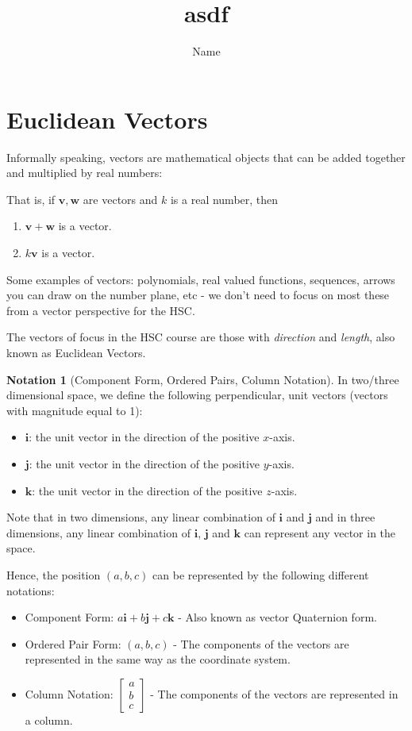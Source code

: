 \documentclass[11pt, a4paper, oneside]{exam}
\title{asdf}
\author{Name
}
\date{}
\theoremstyle{definition}\newtheorem{define}{Definition}[section]
\theoremstyle{remark}\newtheorem{remark}{Remark}
\theoremstyle{definition}\newtheorem{example}{Example}[subsection]
\theoremstyle{definition}\newtheorem{notation}{Notation}[section]
\theoremstyle{definition}\newtheorem{theorem}{Theorem}[section]
\theoremstyle{definition}\newtheorem{corollary}{Corollary}[section]
\begin{document}
%
%

\section{Euclidean Vectors}

Informally speaking, vectors are mathematical objects that can be added together and multiplied by real numbers:

That is, if $\mathbf{v}, \mathbf{w}$ are vectors and $k$ is a real number, then
\begin{enumerate}
  \item $\mathbf{v} + \mathbf{w}$ is a vector.
  \item $k\mathbf{v}$ is a vector.
\end{enumerate}

Some examples of vectors: polynomials, real valued functions, sequences, arrows you can draw on the number plane, etc - we don't need to focus on most these from a vector perspective for the HSC.

The vectors of focus in the HSC course are those with \emph{direction} and \emph{length}, also known as Euclidean Vectors.

\begin{notation}[Component Form, Ordered Pairs, Column Notation]
	In two/three dimensional space, we define the following perpendicular, unit vectors (vectors with magnitude equal to 1):
	\begin{itemize}
		\item $\mathbf{i}$: the unit vector in the direction of the positive $x$-axis.
		\item $\mathbf{j}$: the unit vector in the direction of the positive $y$-axis.
		\item $\mathbf{k}$: the unit vector in the direction of the positive $z$-axis.
	\end{itemize}
	Note that in two dimensions, any linear combination of $\mathbf{i}$ and $\mathbf{j}$ and in three dimensions, any linear combination of $\mathbf{i}$, $\mathbf{j}$ and $\mathbf{k}$ can represent any vector in the space.

	Hence, the position $(a,b,c)$ can be represented by the following different notations:
	\begin{itemize}
    \item Component Form: $a\mathbf{i} + b\mathbf{j} + c \mathbf{k}$ - Also known as vector Quaternion form.
		\item Ordered Pair Form: $(a,b,c)$ - The components of the vectors are represented in the same way as the coordinate system.
    \item Column Notation: $\left[\begin{matrix} a \\ b \\ c\end{matrix}\right]$ - The components of the vectors are represented in a column.
  \end{itemize}
\end{notation}
\end{document}
